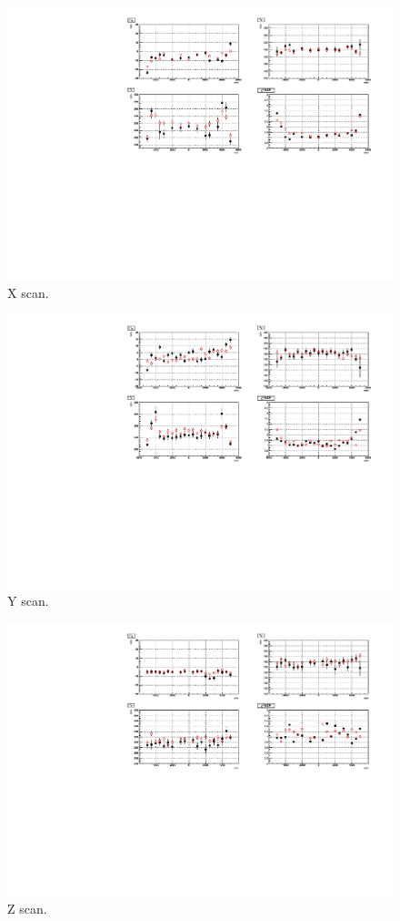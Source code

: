 \begin{figure}
	\centering
	\includegraphics[width=12cm]{MPW_N16_xscanResol_itrCut.pdf}
	\caption{X scan.}
	\label{MPWscanXResol}
\end{figure}


\begin{figure}
	\centering
	\includegraphics[width=12cm]{MPW_N16_yscanResol_itrCut.pdf}
	\caption{Y scan.}
\label{MPWscanYResol}
\end{figure}

\begin{figure}
	\centering
	\includegraphics[width=12cm]{MPW_N16_zscanResol_itrCut.pdf}
	\caption{Z scan.}
\label{MPWscanZResol}
\end{figure}

